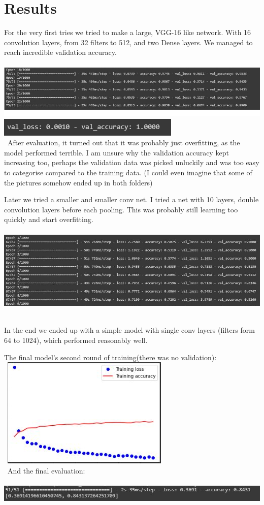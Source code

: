 \documentclass[11pt]{article}
\begin{document}
\section{Results}


For the very first tries we tried to make a large, VGG-16 like network. With 16 convolution layers, from 32 filters to 512, and two Dense layers. We managed to reach incredible validation accuracy.
\\\
\includegraphics[scale=0.5]{over_fit_1}
\includegraphics[scale=0.5]{limitless_overfitting}
\\\
After evaluation, it turned out that it was probably just overfitting, as the model performed terrible. I am unsure why the validation accuracy kept increasing too, perhaps the validation data was picked unluckily and was too easy to categorise compared to the training data. (I could even imagine that some of the pictures somehow ended up in both folders)

Later we tried a smaller and smaller conv net. I tried a net with 10 layers, double convolution layers before each pooling. This was probably still learning too quickly and start overfitting.
\\\
\includegraphics[scale=0.5]{double}
\\\

In the end we ended up with a simple model with single conv layers (filters form 64 to 1024), which performed reasonably well.

The final model's second round of training(there was no validation):
\\\
\includegraphics[scale=0.5]{long_train}
\\\
And the final evaluation:
\\\
\includegraphics[scale=0.5]{eval}
\end{document}
